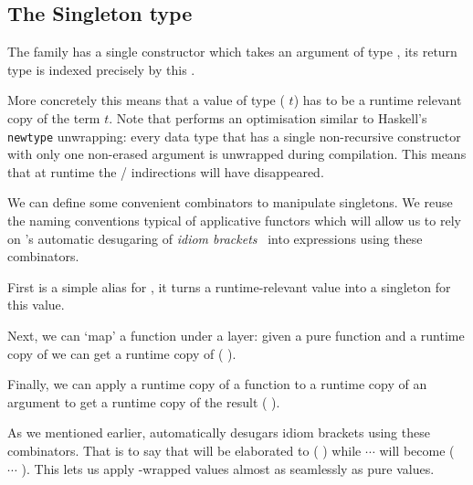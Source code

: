 
\subsection{The Singleton type}\label{sec:datasingleton}

The  family has a single constructor
which takes an argument  of type ,
its return type is indexed precisely by this .


More concretely this means that a value of type
( $t$) has to be a runtime relevant
copy of the term $t$.
%
Note that \idris{} performs an optimisation similar to Haskell's
\texttt{newtype} unwrapping: every data type that has a single
non-recursive constructor with only one non-erased argument
is unwrapped during compilation.
%
This means that at runtime the
 /  indirections
will have disappeared.

We can define some convenient combinators to manipulate
singletons.
%
We reuse the naming conventions typical of applicative
functors which will allow us to rely on \idris{}'s automatic
desugaring of \emph{idiom brackets}~\citep{DBLP:journals/jfp/McbrideP08}
into expressions using these combinators.


First  is a simple alias for ,
it turns a runtime-relevant value  into a singleton for
this value.


Next, we can `map' a function under a  layer: given
a pure function  and a runtime copy of  we
can get a runtime copy of ( ).


Finally, we can apply a runtime copy of a function 
to a runtime copy of an argument 
to get a runtime copy of the result ( ).

As we mentioned earlier, \idris{} automatically desugars idiom brackets
using these combinators. That is to say that
\IdrisKeyword{[|}  \IdrisKeyword{|]} will be elaborated to
( ) while
\IdrisKeyword{[|}   $\cdots$  \IdrisKeyword{|]}
will become
( \IdrisFunction{<\$>}  \IdrisFunction{<*>} $\cdots$ \IdrisFunction{<*>} ).
%
This lets us apply -wrapped values almost as seamlessly as pure values.
